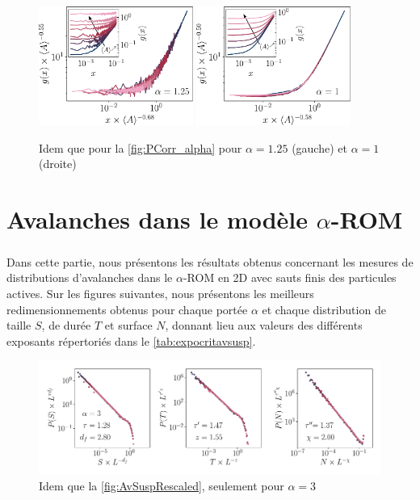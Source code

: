 \begin{figure}[h]
\centering
\includegraphics[width=0.45\textwidth]{Chapitre3/Figures/Interpretation/PCorr/PCorr_rescaled_alpha125_mean.pdf}
\includegraphics[width=0.45\textwidth]{Chapitre3/Figures/Interpretation/PCorr/PCorr_rescaled_alpha1_mean.pdf}
\caption{Idem que pour la \autoref{fig:PCorr_alpha} pour $\alpha = 1.25$ (gauche) et $\alpha = 1$ (droite)}
\label{fig:PCorrAnnexe5}
\end{figure}

\FloatBarrier

\resumetocwriting

\section{Avalanches dans le modèle $\alpha$-ROM}

\label{sec:AvTBLRRAnnexe}

\subparagraph{}Dans cette partie, nous présentons les résultats obtenus concernant les mesures de distributions d'avalanches dans le $\alpha$-ROM en 2D avec sauts finis des particules actives. Sur les figures suivantes, nous présentons les meilleurs redimensionnements obtenus pour chaque portée $\alpha$ et chaque distribution de taille $S$, de durée $T$ et surface $N$, donnant lieu aux valeurs des différents exposants répertoriés dans le \autoref{tab:expocritavsusp}.

\begin{figure}[h]
\centering
\includegraphics[width=\textwidth]{Chapitre3/Figures/Avalanches/Rescale_Av_alpha3.pdf}
\caption{Idem que la \autoref{fig:AvSuspRescaled}, seulement pour $\alpha=3$}
	\label{fig:annexAv1}
\end{figure}

